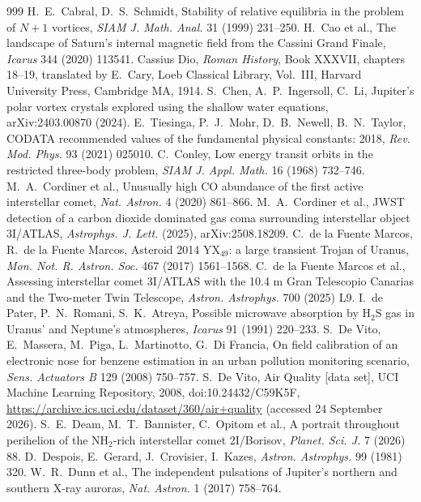 \documentclass[11pt]{article}
\theoremstyle{definition}\newtheorem{definition}[theorem]{Definition}
\theoremstyle{remark}\newtheorem{remark}[theorem]{Remark}
\begin{document}
\begin{thebibliography}{999}
 H.~E.~Cabral, D.~S.~Schmidt, Stability of relative equilibria in the problem of $N+1$ vortices, \emph{SIAM J. Math. Anal.} 31 (1999) 231--250.
 H.~Cao et al., The landscape of Saturn's internal magnetic field from the Cassini Grand Finale, \emph{Icarus} 344 (2020) 113541.
 Cassius Dio, \emph{Roman History}, Book XXXVII, chapters 18--19, translated by E.~Cary, Loeb Classical Library, Vol.~III, Harvard University Press, Cambridge MA, 1914.
 S.~Chen, A.~P.~Ingersoll, C.~Li, Jupiter's polar vortex crystals explored using the shallow water equations, arXiv:2403.00870 (2024).
 E.~Tiesinga, P.~J.~Mohr, D.~B.~Newell, B.~N.~Taylor, CODATA recommended values of the fundamental physical constants: 2018, \emph{Rev. Mod. Phys.} 93 (2021) 025010.
 C.~Conley, Low energy transit orbits in the restricted three-body problem, \emph{SIAM J. Appl. Math.} 16 (1968) 732--746.
 M.~A.~Cordiner et al., Unusually high CO abundance of the first active interstellar comet, \emph{Nat. Astron.} 4 (2020) 861--866.
 M.~A.~Cordiner et al., JWST detection of a carbon dioxide dominated gas coma surrounding interstellar object 3I/ATLAS, \emph{Astrophys. J. Lett.} (2025), arXiv:2508.18209.
 C.~de la Fuente Marcos, R.~de la Fuente Marcos, Asteroid 2014 YX$_{49}$: a large transient Trojan of Uranus, \emph{Mon. Not. R. Astron. Soc.} 467 (2017) 1561--1568.
 C.~de la Fuente Marcos et al., Assessing interstellar comet 3I/ATLAS with the 10.4 m Gran Telescopio Canarias and the Two-meter Twin Telescope, \emph{Astron. Astrophys.} 700 (2025) L9.
 I.~de Pater, P.~N.~Romani, S.~K.~Atreya, Possible microwave absorption by H$_2$S gas in Uranus' and Neptune's atmospheres, \emph{Icarus} 91 (1991) 220--233.
 S.~De Vito, E.~Massera, M.~Piga, L.~Martinotto, G.~Di Francia, On field calibration of an electronic nose for benzene estimation in an urban pollution monitoring scenario, \emph{Sens. Actuators B} 129 (2008) 750--757.
 S.~De Vito, Air Quality [data set], UCI Machine Learning Repository, 2008, doi:10.24432/C59K5F, \url{https://archive.ics.uci.edu/dataset/360/air+quality} (accessed 24 September 2026).
 S.~E.~Deam, M.~T.~Bannister, C.~Opitom et al., A portrait throughout perihelion of the NH$_2$-rich interstellar comet 2I/Borisov, \emph{Planet. Sci. J.} 7 (2026) 88.
 D.~Despois, E.~Gerard, J.~Crovisier, I.~Kazes, \emph{Astron. Astrophys.} 99 (1981) 320.
 W.~R.~Dunn et al., The independent pulsations of Jupiter's northern and southern X-ray auroras, \emph{Nat. Astron.} 1 (2017) 758--764.

\end{thebibliography}
\end{document}
